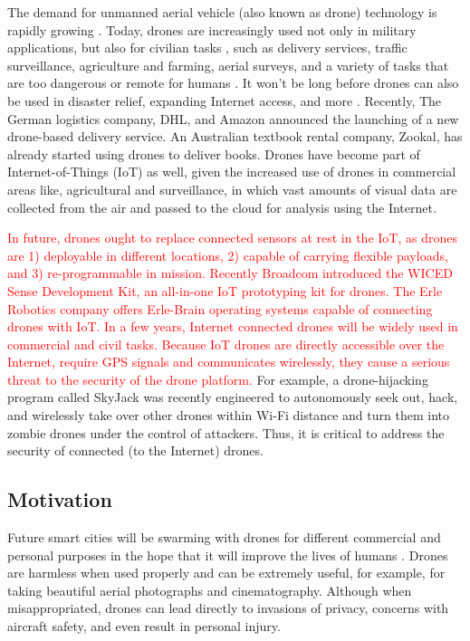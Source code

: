 \documentclass[conference]{IEEEtran}
\begin{document}
The demand for unmanned aerial vehicle (also known as drone) technology is rapidly growing \cite{meyerson2015top}. 
Today, drones are increasingly used not only in military applications, but also for civilian tasks \cite{vattapparamban2016drones}, such as delivery services, traffic surveillance, agriculture and farming, aerial surveys, and a variety of tasks that are too dangerous or remote for humans \cite{ruiz2017unmanned,David, corcoran2014drone}. 
It won't be long before drones can also be used in disaster relief, expanding Internet access, and more \cite{David}. 
Recently, The German logistics company, DHL, and Amazon announced the launching of a new drone-based delivery service.
An Australian textbook rental company, Zookal, has already started using drones to deliver
books. 
Drones have become part of Internet-of-Things (IoT) as well, given the increased use of drones in commercial areas like, agricultural and surveillance, in which vast amounts of visual data are collected from the air and passed to the cloud for analysis using the Internet.

\textcolor{red}{In future, drones ought to replace connected sensors at rest in the IoT, as drones are 1) deployable in different locations, 2) capable of carrying flexible payloads, and 3) re-programmable in mission. Recently Broadcom introduced the WICED Sense Development Kit, an all-in-one IoT prototyping kit for drones. The Erle Robotics company offers Erle-Brain operating systems capable of connecting drones with IoT. 
In a few years, Internet connected drones will be widely used in commercial and civil tasks. 
Because IoT drones are directly accessible over the Internet, require GPS signals and communicates wirelessly, they cause a serious threat to the security of the drone platform.}
For example, a drone-hijacking program called SkyJack was recently engineered to 
autonomously seek out, hack, and wirelessly take over other drones within Wi-Fi distance and turn them into zombie drones under the control of attackers.
Thus, it is critical to address the security of connected (to the Internet) drones. 
 
\subsection{Motivation}
Future smart cities will be swarming with drones for different commercial and personal purposes in the hope that it will improve the lives of humans  \cite{nonami2007prospect}. Drones are harmless when used properly and can be extremely useful, for example, for taking beautiful aerial photographs and cinematography. Although when misappropriated, drones can lead directly to invasions of privacy, concerns with aircraft safety, and even result in personal injury. 
\end{document}
